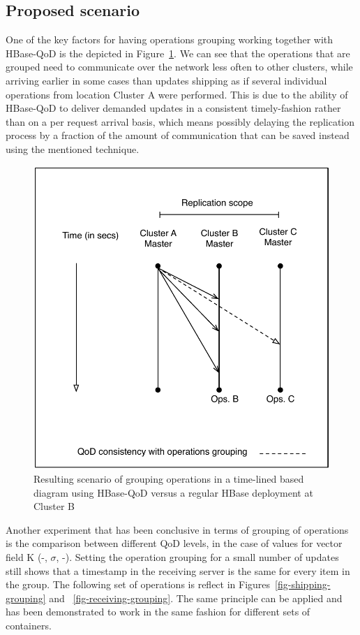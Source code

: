 \subsection{Proposed scenario}
One of the key factors for having operations grouping working together with HBase-QoD is the depicted in Figure~\ref{fig-qod-grouping}. We can see that the operations that are grouped need to communicate over the network less often to other clusters, while arriving earlier in some cases than updates shipping as if several individual operations from location Cluster A were performed. This is due to the ability of HBase-QoD to deliver demanded updates in a consistent timely-fashion rather than on a per request arrival basis, which means possibly delaying the replication process by a fraction of the amount of communication that can be saved instead using the mentioned technique.

\begin{figure}
\centering
\includegraphics[scale=0.6]{figs/operation-grouping.pdf}
\caption{Resulting scenario of grouping operations in a time-lined based diagram using HBase-QoD versus a regular HBase deployment at Cluster B}
\label{fig-qod-grouping}
\end{figure}

Another experiment that has been conclusive in terms of grouping of operations is the comparison between different QoD levels, in the case of values for vector field K (-, $\sigma$, -). Setting the operation grouping for a small number of updates still shows that a timestamp in the receiving server is the same for every item in the group. The following set of operations is reflect in Figures~\ref{fig-shipping-grouping} and ~\ref{fig-receiving-grouping}. The same principle can be applied and has been demonstrated to work in the same fashion for different sets of containers.

